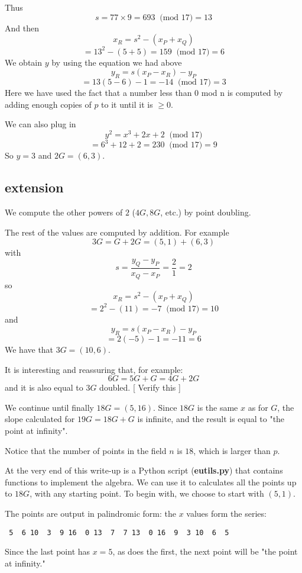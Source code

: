 \documentclass[11pt, oneside]{article}
\begin{document}
Thus
\[ s = 77 \times 9 = 693   \ \text{ (mod } 17) = 13 \]
And then
\[ x_R = s^2 - (x_P + x_Q) \]
\[ = 13^2 - (5 + 5) = 159 \ \text{ (mod } 17) = 6  \] 
We obtain $y$ by using the equation we had above
\[ y_R = s(x_P - x_R) - y_P \]
\[ = 13 (5 - 6) - 1 = -14 \ \text{ (mod } 17) = 3  \] 
Here we have used the fact that a number less than 0 mod n is computed by adding enough copies of $p$ to it until it is $\ge 0$.

We can also plug in
\[ y^2 = x^3 + 2x + 2 \ \text{ (mod } 17) \]
\[ = 6^3 + 12 + 2 = 230   \ \text{ (mod } 17) = 9 \]
So $y = 3$ and $2G = (6,3)$.

\subsection*{extension}

We compute the other powers of $2$ ($4G, 8G$, etc.) by point doubling.

The rest of the values are computed by addition.  For example
\[ 3G = G + 2G = (5,1) + (6,3) \]
with
\[ s = \frac{y_Q - y_P}{x_Q - x_P} = \frac{2}{1} = 2 \]
so
\[ x_R = s^2 - (x_P + x_Q) \]
\[ = 2^2 - (11) = -7  \ \text{ (mod } 17)  = 10 \]
and
\[ y_R = s(x_P - x_R) - y_P \]
\[ = 2(-5) - 1 = -11 = 6 \]
We have that $3G = (10,6)$.

It is interesting and reassuring that, for example:
\[ 6G = 5G + G = 4G + 2G \]
and it is also equal to $3G$ doubled.  [ Verify this ]

We continue until finally $18G = (5,16)$.  Since $18G$ is the same $x$ as for $G$, the slope calculated for $19G = 18G + G$ is infinite, and the result is equal to "the point at infinity".

Notice that the number of points in the field $n$ is $18$, which is larger than $p$.

At the very end of this write-up is a Python script (\textbf{eutils.py}) that contains functions to implement the algebra.  We can use it to calculates all the points up to $18G$, with any starting point.  To begin with, we choose to start with $(5,1)$.

The points are output in palindromic form:  the $x$ values form the series:
\begin{verbatim}
 5  6 10  3  9 16  0 13  7  7 13  0 16  9  3 10  6  5 
\end{verbatim}

Since the last point has $x=5$, as does the first, the next point will be "the point at infinity."
\end{document}
